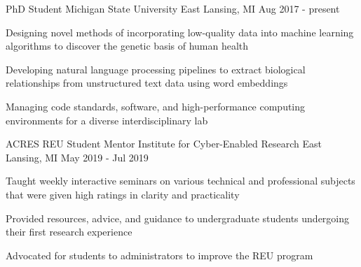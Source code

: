 

\begin{cventries}

  \cventry
    {PhD Student} %
    {Michigan State University} %
    {East Lansing, MI} %
    {Aug 2017 - present} %
    {
      \begin{cvitems} %
        \item {Designing novel methods of incorporating low-quality data into machine learning algorithms to discover the genetic basis of human health}
        \item {Developing natural language processing pipelines to extract biological relationships from unstructured text data using word embeddings}
        \item {Managing code standards, software, and high-performance computing environments for a diverse interdisciplinary lab}
      \end{cvitems}
    }

  \cventry
    {ACRES REU Student Mentor} %
    {Institute for Cyber-Enabled Research} %
    {East Lansing, MI} %
    {May 2019 - Jul 2019} %
    {
      \begin{cvitems} %
        \item {Taught weekly interactive seminars on various technical and professional subjects that were given high ratings in clarity and practicality}
        \item {Provided resources, advice, and guidance to undergraduate students undergoing their first research experience}
        \item {Advocated for students to administrators to improve the REU program}
      \end{cvitems}
    }


\end{cventries}
